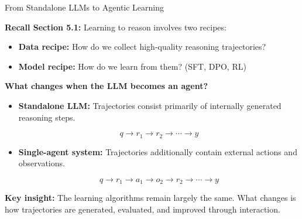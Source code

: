\documentclass[aspectratio=169]{beamer}
\begin{document}
\begin{frame}{From Standalone LLMs to Agentic Learning}

\textbf{Recall Section 5.1:} Learning to reason involves two recipes:

\begin{itemize}
    \item \textbf{Data recipe:} How do we collect high-quality reasoning trajectories?
    \item \textbf{Model recipe:} How do we learn from them? (SFT, DPO, RL)
\end{itemize}

\vspace{0.3cm}

\textbf{What changes when the LLM becomes an agent?}

\begin{itemize}
    \item \textbf{Standalone LLM:} Trajectories consist primarily of internally generated reasoning steps.

    \[
    q \rightarrow r_1 \rightarrow r_2 \rightarrow \cdots \rightarrow y
    \]

    \item \textbf{Single-agent system:} Trajectories additionally contain external actions and observations.

    \[
    q \rightarrow r_1 \rightarrow a_1 \rightarrow o_2
    \rightarrow r_2 \rightarrow \cdots \rightarrow y
    \]
\end{itemize}

\vspace{0.2cm}

\textbf{Key insight:} The learning algorithms remain largely the same. What changes is how trajectories are generated, evaluated, and improved through interaction.

\end{frame}
\end{document}
